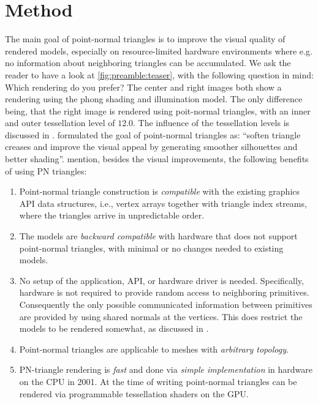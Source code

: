 
\section{Method}
\label{s:method}
The main goal of point-normal triangles is to improve the visual quality of rendered models, especially on resource-limited hardware environments where e.g. no information about neighboring triangles can be accumulated. We ask the reader to have a look at \cref{fig:preamble:teaser}, with the following question in mind: Which rendering do you prefer? The center and right images both show a rendering using the phong shading and illumination model. The only difference being, that the right image is rendered using poit-normal triangles, with an inner and outer tessellation level of $12.0$. The influence of the tessellation levels is discussed in . \citeauthor{vlachos2001curved} formulated the goal of point-normal triangles as: ``soften triangle creases and improve the visual appeal by generating smoother silhouettes and better shading''. \citeauthor{vlachos2001curved} mention, besides the visual improvements, the following benefits of using PN triangles:

\begin{enumerate}[label=(\roman*)]
 	\item 
 		Point-normal triangle construction is \textit{compatible} with the existing graphics API data structures, i.e., vertex arrays together with triangle index streams, where the triangles arrive in unpredictable order.
 	\item 
 		The models are \textit{backward compatible} with hardware that does not support point-normal triangles, with minimal or no changes needed to existing models.
 	\item 
 		No setup of the application, API, or hardware driver is needed. Specifically, hardware is not required to provide random access to neighboring primitives. Consequently the only possible communicated information between primitives are provided by using shared normals at the vertices. This does restrict the models to be rendered somewhat, as discussed in .
 	\item 
 		Point-normal triangles are applicable to meshes with \textit{arbitrary topology}.
 	\item 
 		PN-triangle rendering is \textit{fast} and done via \textit{simple implementation} in hardware on the CPU in 2001. At the time of writing point-normal triangles can be rendered via programmable tessellation shaders on the GPU.
 \end{enumerate} 

